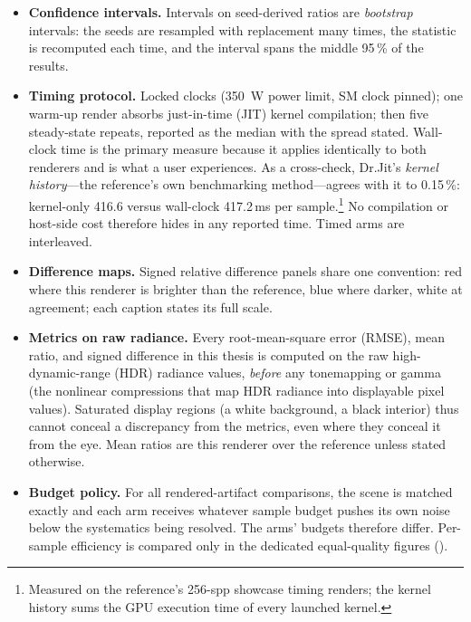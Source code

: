 \begin{itemize}
  The equal-quality speedup of renderer $B$ over renderer $A$ is therefore
  $(k_A t_A)/(k_B t_B)$. This is the only cross-renderer efficiency metric used in this
  thesis.
  \item \textbf{Confidence intervals.} Intervals on seed-derived ratios are \emph{bootstrap}
  intervals: the seeds are resampled with replacement many times, the statistic is recomputed
  each time, and the interval spans the middle \num{95}\,\% of the results.
  \item \textbf{Timing protocol.} Locked clocks (\SI{350}{\watt} power limit, SM clock pinned); one
  warm-up render absorbs just-in-time (JIT) kernel compilation; then five steady-state repeats, reported as the
  median with the spread stated. Wall-clock time is the primary measure because it applies
  identically to both renderers and is what a user experiences. As a cross-check, Dr.Jit's
  \emph{kernel history}---the reference's own benchmarking method---agrees with it to
  \num{0.15}\,\%: kernel-only \num{416.6} versus
  wall-clock \num{417.2}\,ms per sample.\footnote{Measured on the reference's \num{256}-spp
  showcase timing renders; the kernel history sums the GPU execution time of every launched
  kernel.} No compilation or host-side
  cost therefore hides in any reported time. Timed arms are interleaved.
  \item \textbf{Difference maps.} Signed relative difference panels share one convention:
  red where this renderer is brighter than the reference, blue where darker, white at
  agreement; each caption states its full scale.
  \item \textbf{Metrics on raw radiance.} Every root-mean-square error (RMSE), mean ratio,
and signed difference in this thesis is computed on the raw high-dynamic-range (HDR)
radiance values, \emph{before} any tonemapping or gamma (the nonlinear compressions that
map HDR radiance into displayable pixel values). Saturated
  display regions (a white background, a black interior) thus cannot conceal a discrepancy from the
  metrics, even where they conceal it from the eye. Mean ratios are this renderer over the
reference unless stated otherwise.
  \item \textbf{Budget policy.} For all rendered-artifact comparisons, the scene is matched exactly
  and each arm receives whatever sample budget pushes its own noise below the systematics being
  resolved. The arms' budgets therefore differ. Per-sample efficiency is compared only in the
  dedicated equal-quality figures ().
\end{itemize}


